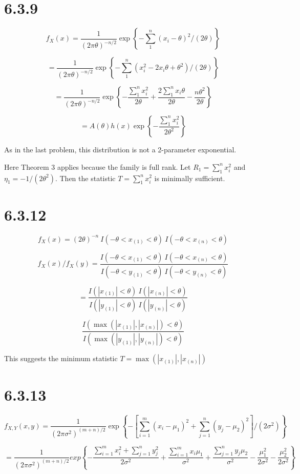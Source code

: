 \documentclass{article}
\begin{document}
\section{6.3.9}
\[
f_X(x) = \frac{1}{(2\pi\theta)^{-n/2}}
\exp \left\{ - \sum_1^n(x_i-\theta)^2/(2\theta) \right\}
\]

\[
= \frac{1}{(2\pi\theta)^{-n/2}}
\exp \left\{ - \sum_1^n(x_i^2-2x_i\theta+\theta^2)/(2\theta) \right\}
\]

\[
= \frac{1}{(2\pi\theta)^{-n/2}}
\exp \left\{-\frac{\sum_1^n x_i^2}{2\theta} + \frac{2 \sum_1^n x_i\theta}
{2\theta} - \frac{n\theta^2}{2\theta} \right\}
\]


\[
= A(\theta)h(x) \exp \left\{-\frac{\sum_1^n x_i^2}{2\theta^2} \right\}
\]

As in the last problem, this distribution is not a 2-parameter exponential.

Here Theorem 3 applies because the family is full rank. Let
$R_1 = \sum_1^n x_i^2$ and $\eta_1 = -1/(2\theta^2)$. Then the statistic
$T = \sum_1^n x_i^2$ is minimally sufficient.

\section{6.3.12}
\[
f_X(x) = (2\theta)^{-n} \ I(-\theta < x_{(1)} < \theta) \ 
I(-\theta < x_{(n)} < \theta)
\]

\[
f_X(x)/f_X(y) = \frac{I(-\theta < x_{(1)} < \theta) \ 
I(-\theta < x_{(n)} < \theta)}
{I(-\theta < y_{(1)} < \theta) \ I(-\theta < y_{(n)} < \theta)}
\]

\[
= \frac{I(|x_{(1)}| < \theta) \ I(|x_{(n)}| < \theta)}
{I(|y_{(1)}| < \theta) \ I(|y_{(n)}| < \theta)}
\]

\[
\frac{I(\max(|x_{(1)}|,|x_{(n)}|) < \theta)}
{I(\max(|y_{(1)}|,|y_{(n)}|) < \theta)}
\]

This suggests the minimum statistic $T = \max(|x_{(1)}|,|x_{(n)}|)$

\section{6.3.13}

\[
f_{X,Y}(x,y) = \frac{1}{(2\pi\sigma^2)^{(m+n)/2}}
\exp \left\{- \left[\sum_{i=1}^m(x_i-\mu_1)^2+\sum_{j=1}^n(y_j-\mu_2)^2\right] /(2\sigma^2)\right\}
\]

\[
=\frac{1}{(2\pi\sigma^2)^{(m+n)/2}}
exp \left\{ -\frac{\sum_{i=1}^m x_i^2 + \sum_{j=1}^n y_j^2}{2\sigma^2} +
\frac{\sum_{i=1}^m x_i\mu_1}{\sigma^2} + \frac{\sum_{j=1}^n y_j\mu_2}{\sigma^2}
 - \frac{\mu_1^2}{2\sigma^2} - \frac{\mu_2^2}{2\sigma^2} \right\}
\]
\end{document}
